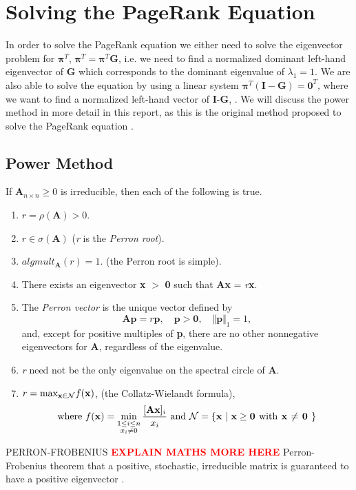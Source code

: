 \documentclass[11pt]{report}
\begin{document}
\section{Solving the PageRank Equation} \label{sec:solve}
In order to solve the PageRank equation we either need to solve the eigenvector problem for $\boldsymbol{\pi}^T$, \(\boldsymbol{\pi}^T = \boldsymbol{\pi}^T\textbf{G}\), i.e. we need to find a normalized dominant left-hand eigenvector of \textbf{G} which corresponds to the dominant eigenvalue of $\lambda_1 = 1$. We are also able to solve the equation by using a linear system \(\boldsymbol{\pi}^T(\textbf{I}-\textbf{G})=\textbf{0}^T\), where we want to find a normalized left-hand vector of \textbf{I}-\textbf{G}, \cite{langville}. We will discuss the power method in more detail in this report, as this is the original method proposed to solve the PageRank equation \cite{langville}.

\subsection{Power Method} \label{sec:power}
\begin{theorem} \normalfont
If \(\textbf{A}_{n \times n} \geq 0\) is irreducible, then each of the following is true.
\begin{enumerate}
\item $r = \rho(\textbf{A}) > 0$.
\item $r \in \sigma (\textbf{A}) $ (\textit{r} is the \textit{Perron root}).
\item $alg mult_\textbf{A}(r) = 1$. (the Perron root is simple).
\item There exists an eigenvector \textbf{x} $>$ \textbf{0} such that \textbf{Ax} = \textit{r}\textbf{x}.
\item The \textit{Perron vector} is the unique vector defined by 
\[\textbf{Ap}=r\textbf{p}, \quad \textbf{p}>\textbf{0}, \quad \Vert \textbf{p} \Vert _1 = 1, \] and, except for positive multiples of \textbf{p}, there are no other nonnegative eigenvectors for \textbf{A}, regardless of the eigenvalue.
\item \textit{r} need not be the only eigenvalue on the spectral circle of \textbf{A}.
\item \(r=\textnormal{max}_{\textbf{x}\in \mathcal{N}} f(\textbf{x})\), (the Collatz-Wielandt formula), 
\begin{equation*}
\textnormal{where } f(\textbf{x}) = \min_{\substack{1\leq i \leq n \\ x_i \neq 0}} \frac{[\textbf{Ax}]_i}{x_i} \textnormal{ and } \mathcal{N} = \{ \textbf{x $\mid \textbf{x} \geq \textbf{0} $ \textnormal{with} \textbf{x} $\neq$ \textbf{0} } \}
\end{equation*}



\end{enumerate}

\end{theorem}
PERRON-FROBENIUS \cite{meyer2000matrix}  \cite{gallager1992discrete} 
\textcolor{red}{\textbf{EXPLAIN MATHS MORE HERE}} Perron-Frobenius theorem that a positive, stochastic, irreducible matrix is guaranteed to have a positive eigenvector \cite{thorson2004modeling}.
\end{document}
